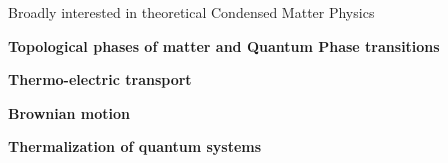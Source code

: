 

\begin{cventries}

  \cventry
    {} %
    {Broadly interested in theoretical Condensed Matter Physics} %
    {} %
    {} %
    {
      \begin{cvitems} %
        \item {\textbf{Topological phases of matter and Quantum Phase transitions}}
        \item {\textbf{Thermo-electric transport}}
        \item {\textbf{Brownian motion}}
        \item {\textbf{Thermalization of quantum systems}}
      \end{cvitems}
    }

\end{cventries}
